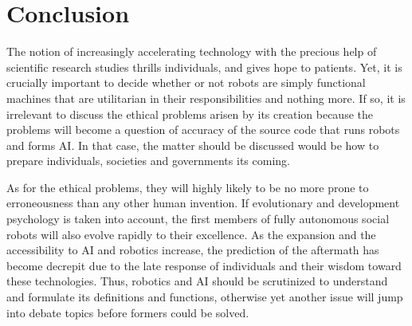 \documentclass[man]{apa6}
\begin{document}
\section{Conclusion}
The notion of increasingly accelerating technology with the precious help of scientific research studies thrills individuals, and gives hope to patients.
Yet, it is crucially important to decide whether or not robots are simply functional machines that are utilitarian in their responsibilities and nothing more. If so, it is irrelevant to discuss the ethical problems arisen by its creation because the problems will become a question of accuracy of the source code that runs robots and forms AI. In that case, the matter should be discussed would be how to prepare individuals, societies and governments its coming. \par
As for the ethical problems, they will highly likely to be no more prone to erroneousness than any other human invention. If evolutionary and development psychology is taken into account, the first members of fully autonomous social robots will also evolve rapidly to their excellence. As the expansion and the accessibility to AI and robotics increase, the prediction of the aftermath has become decrepit due to the late response of individuals and their wisdom toward these technologies. Thus, robotics and AI should be scrutinized to understand and formulate its definitions and functions, otherwise yet another issue will jump into debate topics before formers could be solved. 


\end{document}
